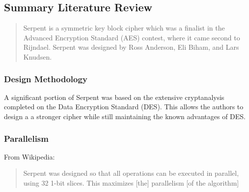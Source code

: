 \subsection{Summary Literature Review}

\blockquote{Serpent is a symmetric key block cipher which was a finalist in the Advanced Encryption Standard (AES) contest, where it came second to Rijndael. Serpent was designed by Ross Anderson, Eli Biham, and Lars Knudsen.}\cite{wikipedia}

\subsubsection{Design Methodology}

A significant portion of Serpent was based on the extensive cryptanalysis completed on the Data Encryption Standard (DES). \cite{submission} This allows the authors to design a a stronger cipher while still maintaining the known advantages of DES.

\subsubsection{Parallelism}

From Wikipedia: \blockquote[\cite{wikipedia}]{Serpent was designed so that all operations can be executed in parallel, using 32 1-bit slices. This maximizes [the] parallelism [of the algorithm]}
